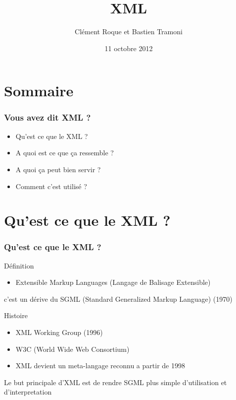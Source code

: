\documentclass{beamer}
\title{XML}
\author{Clément Roque et Bastien Tramoni}\institute{Université des Sciences Montpellier 2, licence d'informatique}
\date{11 octobre 2012}
\begin{document}
 \begin{frame}

  \titlepage

  \end{frame}
\section*{Sommaire}
\begin{frame}
	\frametitle{Vous avez dit XML ?}	
	\begin{itemize}
 \pause\item Qu'est ce que le XML ?
 \pause\item A quoi est ce que ça ressemble ?
 \pause\item A quoi ça peut bien servir ?
 \pause\item Comment c'est utilisé ?
	\end{itemize}
\end{frame}

\section{Qu'est ce que le XML ?}
\begin{frame}
      \frametitle{Qu'est ce que le XML ?}
    \begin{block}{ Définition }
	\begin{itemize}
  \pause \item Extensible Markup Languages (Langage de Balisage Extensible)
  	\end{itemize}
	\end{block}
	\pause c'est un dérive du SGML (Standard Generalized Markup Language) (1970)
 \end{frame}

\begin{frame}
     
    \begin{block}{Histoire}
	\begin{itemize}
   \pause\item XML Working Group (1996)
   \pause\item W3C (World Wide Web Consortium)
   \pause\item XML devient un meta-langage reconnu a partir de 1998
\end{itemize}

\end{block}
\pause Le but principale d'XML est de rendre SGML plus simple d'utilisation et d'interpretation
\end{frame}
\end{document}

